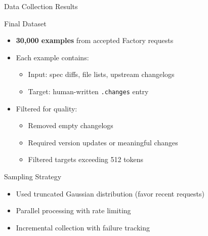 \begin{frame}{Data Collection Results}
\begin{block}{Final Dataset}
\begin{itemize}
  \item \textbf{30,000 examples} from accepted Factory requests
  \item Each example contains:
  \begin{itemize}
    \item Input: spec diffs, file lists, upstream changelogs
    \item Target: human-written \texttt{.changes} entry
  \end{itemize}
  \item Filtered for quality:
  \begin{itemize}
    \item Removed empty changelogs
    \item Required version updates or meaningful changes
    \item Filtered targets exceeding 512 tokens
  \end{itemize}
\end{itemize}
\end{block}

\begin{block}{Sampling Strategy}
\begin{itemize}
  \item Used truncated Gaussian distribution (favor recent requests)
  \item Parallel processing with rate limiting
  \item Incremental collection with failure tracking
\end{itemize}
\end{block}
\end{frame}

